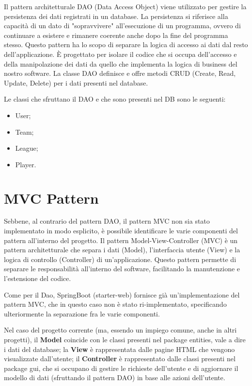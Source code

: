 \documentclass[twoside,openright,titlepage,fleqn,headinclude,12pt,a4paper,BCOR=5mm,footinclude]{scrbook}
\begin{document}
Il pattern architetturale DAO (Data Access Object) viene utilizzato per gestire la persistenza dei dati registrati in un database. La persistenza si riferisce alla capacità di un dato di "sopravvivere" all'esecuzione di un programma, ovvero di continuare a esistere e rimanere coerente anche dopo la fine del programma stesso. Questo pattern ha lo scopo di separare la logica di accesso ai dati dal resto dell'applicazione. È progettato per isolare il codice che si occupa dell'accesso e della manipolazione dei dati da quello che implementa la logica di business del nostro software. La classe DAO definisce e offre metodi CRUD (Create, Read, Update, Delete) per i dati presenti nel database.

Le classi che sfruttano il DAO e che sono presenti nel DB sono le seguenti:

\begin{itemize}
    \item User;
    \item Team;
    \item League;
    \item Player.
    
\end{itemize}

\section{MVC Pattern}
Sebbene, al contrario del pattern DAO, il pattern MVC non sia stato implementato in modo esplicito, è possibile identificare le varie componenti del pattern all'interno del progetto. Il pattern Model-View-Controller (MVC) è un pattern architetturale che separa i dati (Model), l'interfaccia utente (View) e la logica di controllo (Controller) di un'applicazione. Questo pattern permette di separare le responsabilità all'interno del software, facilitando la manutenzione e l'estensione del codice. 

Come per il Dao, SpringBoot (starter-web) fornisce già un'implementazione del pattern MVC, che in questo caso non è stato ri-implementato, specificando ulteriormente la separazione fra le varie componenti. 

Nel caso del progetto corrente (ma, essendo un impiego comune, anche in altri progetti), il \textbf{Model} coincide con le classi presenti nel package entities, vale a dire i dati del database; la \textbf{View} è rappresentata dalle pagine HTML che vengono visualizzate dall'utente; il \textbf{Controller} è rappresentato dalle classi presenti nel package gui, che si occupano di gestire le richieste dell'utente e di aggiornare il modello di dati (sfruttando il pattern DAO) in base alle azioni dell'utente.
\end{document}
